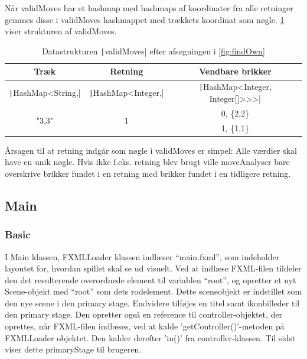 Når validMoves har et hashmap med hashmaps af koordinater fra alle retninger gemmes disse i validMoves hashmappet med trækkets koordinat som nøgle. \cref{tbl:hashmaps} viser strukturen af validMoves.
\begin{table}[H]
    \centering
    \caption{Datastrukturen \texttt|validMoves| efter afsøgningen i \cref{fig:findOwn}}\label{tbl:hashmaps}
    \begin{tabular}{ccc}
        \toprule
        Træk                               & Retning                             & Vendbare brikker                                 \\
        \midrule
        \texttt|HashMap<String,| & \texttt|HashMap<Integer,| & \texttt|HashMap<Integer, Integer[]>>>| \\
        \multirow{2}{*}{"3,3"}             & \multirow{2}{*}{1}                  & 0, \{2,2\}                                       \\
                                           &                                     & 1, \{1,1\}                                       \\
        \bottomrule
    \end{tabular}
\end{table}
Årsagen til at retning indgår som nøgle i validMoves er simpel: Alle værdier skal have en unik nøgle. Hvis ikke f.eks. retning blev brugt ville moveAnalyser bare overskrive brikker fundet i en retning med brikker fundet i en tidligere retning.
\subsection{Main}
\subsubsection{Basic}\label{bm}
I Main klassen, FXMLLoader klassen indlæser ``main.fxml'', som indeholder layoutet for, hvordan spillet skal se ud visuelt. Ved at indlæse FXML-filen tildeler den det resulterende overordnede element til variablen ``root'', og opretter et nyt Scene-objekt med ``root'' som dets rodelement. Dette sceneobjekt er indstillet som den nye scene i den primary stage. Endvidere tilføjes en titel samt ikonbilleder til den primary stage. Den opretter også en reference til controller-objektet, der oprettes, når FXML-filen indlæses, ved at kalde 'getController()'-metoden på FXMLLoader objektet. Den kalder derefter 'in()' fra controller-klassen. Til sidst viser dette primaryStage til brugeren.
